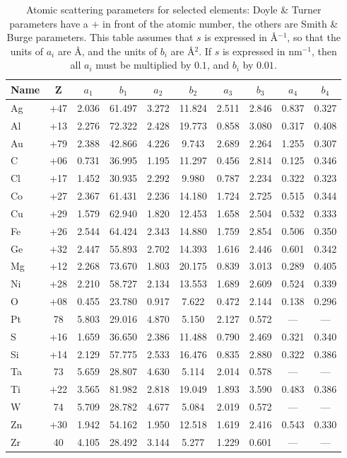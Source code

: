 \begin{table}[h!]
\centering\leavevmode
\begin{tabular}{|l|c|cccccccc|}
\hline
Name&Z &$a_1$&$b_1$&$a_2$&$b_2$&$a_3$&$b_3$&$a_4$&$b_4$\\
\hline\hline
Ag &+47&2.036& 61.497 &3.272 &11.824 &2.511 &2.846 &0.837&0.327\\
Al &+13&2.276& 72.322 &2.428 &19.773 &0.858 &3.080 &0.317&0.408\\
Au &+79&2.388& 42.866 &4.226 & 9.743 &2.689 &2.264 &1.255&0.307\\
C &+06&0.731& 36.995 &1.195 &11.297 &0.456 &2.814 &0.125 &0.346\\
Cl &+17&1.452& 30.935 &2.292 & 9.980 &0.787 &2.234 &0.322&0.323\\
\hline
Co &+27&2.367& 61.431 &2.236 &14.180 &1.724 &2.725 &0.515&0.344\\
Cu &+29&1.579& 62.940 &1.820 &12.453 &1.658 &2.504 &0.532&0.333\\
Fe &+26&2.544& 64.424 &2.343 &14.880 &1.759 &2.854 &0.506&0.350\\
Ge &+32&2.447& 55.893 &2.702 &14.393 &1.616 &2.446 &0.601&0.342\\
Mg &+12&2.268& 73.670 &1.803 &20.175 &0.839 &3.013 &0.289&0.405\\
\hline
Ni &+28&2.210& 58.727 &2.134 &13.553 &1.689 &2.609 &0.524&0.339\\
O &+08&0.455& 23.780 &0.917 & 7.622 &0.472 &2.144 &0.138 &0.296\\
Pt & 78&5.803& 29.016 &4.870 & 5.150 &2.127 &0.572 &--- &---\\
S &+16&1.659& 36.650 &2.386 &11.488 &0.790 &2.469 &0.321 &0.340\\
Si &+14&2.129& 57.775 &2.533 &16.476 &0.835 &2.880 &0.322&0.386\\
\hline
Ta & 73&5.659& 28.807 &4.630 & 5.114 &2.014 &0.578 &--- &---\\
Ti &+22&3.565& 81.982 &2.818 &19.049 &1.893 &3.590 &0.483&0.386\\
W & 74&5.709& 28.782 &4.677 & 5.084 &2.019 &0.572 &--- &---\\
Zn &+30&1.942& 54.162 &1.950 &12.518 &1.619 &2.416 &0.543&0.330\\
Zr & 40&4.105& 28.492 &3.144 & 5.277 &1.229 &0.601 &--- &---\\
\hline
\end{tabular}
\caption{\label{\chabbr:tb:DTSB}Atomic scattering parameters for selected elements:
Doyle \& Turner parameters have a $+$ in front of the atomic number,
the others are Smith \& Burge parameters. This table assumes that
$s$ is expressed in \AA$^{-1}$, so that the units of $a_i$ are \AA, and the units of $b_i$ are \AA$^2$.
If $s$ is expressed in nm$^{-1}$, then all $a_i$ must be multiplied by $0.1$, and $b_i$ by $0.01$.}
\end{table}




